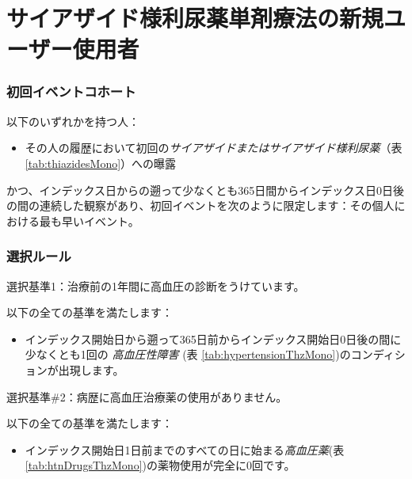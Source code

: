 \documentclass[
  11pt]{book}
\providecommand{\tightlist}{%
  \setlength{\itemsep}{0pt}\setlength{\parskip}{0pt}}
\theoremstyle{definition}
\theoremstyle{definition}
\theoremstyle{definition}
\theoremstyle{definition}
\theoremstyle{remark}
\begin{document}
\section{サイアザイド様利尿薬単剤療法の新規ユーザー使用者}\label{ThiazidesMono}

\subsubsection*{初回イベントコホート}\label{ux521dux56deux30a4ux30d9ux30f3ux30c8ux30b3ux30dbux30fcux30c8-4}

以下のいずれかを持つ人：

\begin{itemize}
\tightlist
\item
  その人の履歴において初回の\emph{サイアザイドまたはサイアザイド様利尿薬}（表 \ref{tab:thiazidesMono}）への曝露
\end{itemize}

かつ、インデックス日からの遡って少なくとも365日間からインデックス日0日後の間の連続した観察があり、初回イベントを次のように限定します：その個人における最も早いイベント。

\subsubsection*{選択ルール}\label{ux9078ux629eux30ebux30fcux30eb-1}

選択基準1：治療前の1年間に高血圧の診断をうけています。

以下の全ての基準を満たします：

\begin{itemize}
\tightlist
\item
  インデックス開始日から遡って365日前からインデックス開始日0日後の間に少なくとも1回の \emph{高血圧性障害} (表 \ref{tab:hypertensionThzMono})のコンディションが出現します。
\end{itemize}

選択基準\#2：病歴に高血圧治療薬の使用がありません。

以下の全ての基準を満たします：

\begin{itemize}
\tightlist
\item
  インデックス開始日1日前までのすべての日に始まる\emph{高血圧薬}(表 \ref{tab:htnDrugsThzMono})の薬物使用が完全に0回です。
\end{itemize}
\end{document}
